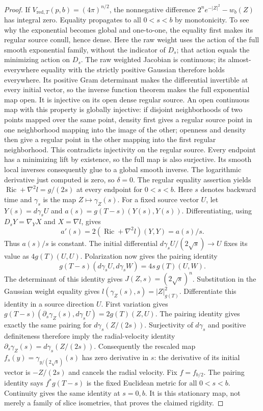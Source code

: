\begin{proof}
If $V_{\mathrm{red},T}(p,b)=(4\pi)^{n/2}$, the nonnegative difference
$2^ne^{-|Z|^2}-w_b(Z)$ has integral zero.  Equality propagates to all
$0<s<b$ by monotonicity.  To see why the exponential becomes global and
one-to-one, the equality first makes its regular source conull, hence dense.
Here the raw weight uses the action of the full smooth exponential family,
without the indicator of $D_s$; that action equals the minimizing action on
$D_s$.  The raw weighted Jacobian is continuous; its almost-everywhere equality with
the strictly positive Gaussian therefore holds everywhere.  Its positive
Gram determinant makes the differential invertible at every initial vector,
so the inverse function theorem makes the full exponential map open.
It is injective on its open dense regular source.  An open continuous map
with this property is globally injective: if disjoint neighborhoods of two
points mapped over the same point, density first gives a regular source
point in one neighborhood mapping into the image of the other; openness and
density then give a regular point in the other mapping into the first
regular neighborhood.  This contradicts injectivity on the regular source.
Every endpoint has a minimizing lift by existence, so the full map is also
surjective.  Its smooth local inverses consequently glue to a global smooth
inverse.  The logarithmic derivative just computed is zero, so $\delta=0$.
The regular equality assertion yields
$\operatorname{Ric}+\nabla^2l=g/(2s)$ at every endpoint for $0<s<b$.
Here $s$ denotes backward time and $\gamma_s$ is the map
$Z\mapsto\gamma_Z(s)$.  For a fixed source vector $U$, let $Y(s)=d\gamma_sU$ and
$a(s)=g(T-s)(Y(s),Y(s))$.  Differentiating, using
$D_sY=\nabla_Y X$ and $X=\nabla l$, gives
\[
 a'(s)=2(\operatorname{Ric}+\nabla^2l)(Y,Y)=a(s)/s.
\]
Thus $a(s)/s$ is constant.  The initial differential
$d\gamma_sU/(2\sqrt s)\to U$ fixes its value as $4g(T)(U,U)$.
Polarization now gives the pairing identity
\[
 g(T-s)(d\gamma_s U,d\gamma_s W)=4s\,g(T)(U,W).
\]
The determinant of this identity gives $J(Z,s)=(2\sqrt s)^n$.
Substitution in the Gaussian weight equality gives
$l(\gamma_Z(s),s)=|Z|_{g(T)}^2$.  Differentiate this identity in a source
direction $U$.  First variation gives
$g(T-s)(\partial_s\gamma_Z(s),d\gamma_sU)=2g(T)(Z,U)$.
The pairing identity gives exactly the same pairing for
$d\gamma_s(Z/(2s))$.  Surjectivity of $d\gamma_s$ and positive definiteness
therefore imply the radial-velocity identity
$\partial_s\gamma_Z(s)=d\gamma_s(Z/(2s))$.
Consequently the rescaled map
$f_s(y)=\gamma_{y/(2\sqrt s)}(s)$ has zero derivative in $s$:
the derivative of its initial vector is $-Z/(2s)$ and cancels the radial
velocity.  Fix $f=f_{b/2}$.  The pairing identity says $f^*g(T-s)$ is the
fixed Euclidean metric for all $0<s<b$.  Continuity gives the same identity
at $s=0,b$.  It is this stationary map, not merely a family of slice
isometries, that proves the claimed rigidity.
\end{proof}

